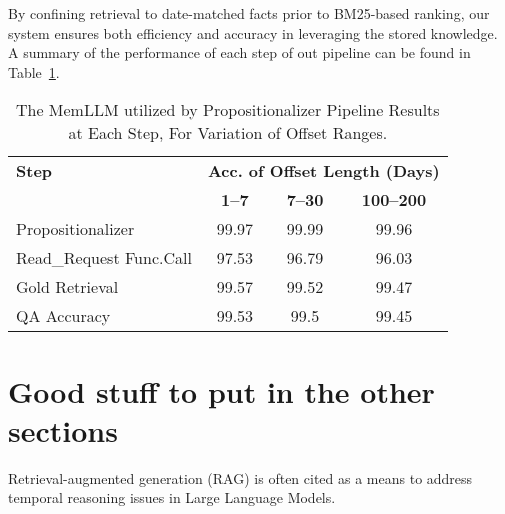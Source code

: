 \documentclass[11pt]{article}
\begin{document}
By confining retrieval to date-matched facts prior to
BM25-based ranking, our system ensures both efficiency and
accuracy in leveraging the stored knowledge. A summary of
the performance of each step of out pipeline can be found in
Table~\ref{tab:memllm}.



\begin{table}[ht]
\centering
\caption{The MemLLM utilized by Propositionalizer Pipeline Results at Each Step, For Variation of Offset Ranges.}
\label{tab:memllm}
\begin{tabular}{l|ccc}
\hline
\textbf{Step} & \multicolumn{3}{c}{\small{\textbf{Acc. of Offset Length (Days)}}} \\
\cline{2-4}
 & \small{\textbf{1--7 }}  & \small{\textbf{7--30 }} & \small{\textbf{100--200 }} \\
\hline
Propositionalizer & 99.97 & 99.99 & 99.96 \\
Read\_Request \small{Func.Call} & 97.53 & 96.79 & 96.03 \\
Gold Retrieval  & 99.57 & 99.52 & 99.47 \\
QA Accuracy  & 99.53 & 99.5 & 99.45 \\
\hline
\end{tabular}
\end{table}


\section{Good stuff to put in the other sections}


Retrieval-augmented generation (RAG) is often cited as a
means to address temporal reasoning issues in Large Language
Models. 

\cite{Aho:72}

\end{document}
